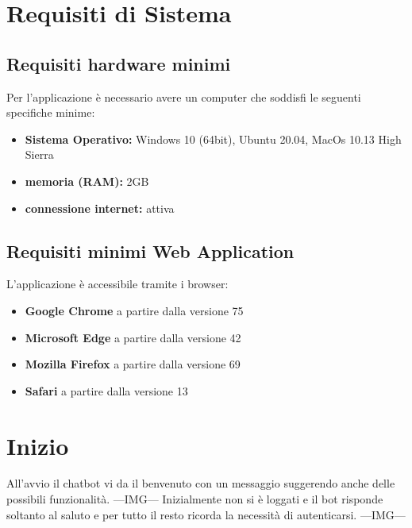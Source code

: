 \section{Requisiti di Sistema}
\subsection{Requisiti hardware minimi}
Per l'applicazione è necessario avere un computer che soddisfi le seguenti specifiche minime:
\begin{itemize}
    \item \textbf{Sistema Operativo:} Windows 10 (64bit), Ubuntu 20.04, MacOs 10.13 High Sierra
    \item \textbf{memoria (RAM):} 2GB
    \item \textbf{connessione internet:} attiva
\end{itemize}
\subsection{Requisiti minimi Web Application}
L'applicazione è accessibile tramite i browser:
\begin{itemize}
    \item \textbf{Google Chrome} a partire dalla versione 75
    \item \textbf{Microsoft Edge} a partire dalla versione 42
    \item \textbf{Mozilla Firefox} a partire dalla versione 69
    \item \textbf{Safari} a partire dalla versione 13
\end{itemize}

\newpage
\section{Inizio}
All'avvio il chatbot vi da il benvenuto con un messaggio suggerendo anche delle possibili funzionalità.
---IMG--- \newline
Inizialmente non si è loggati e il bot risponde soltanto al saluto e per tutto il resto ricorda la necessità di autenticarsi.
---IMG--- \newline
